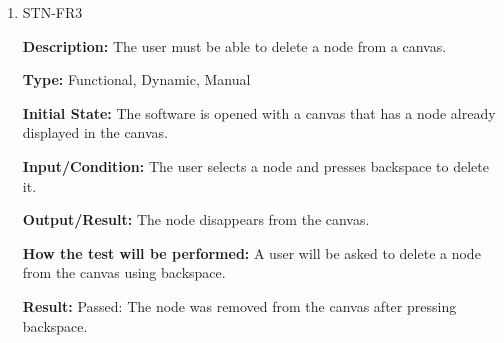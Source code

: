 \documentclass[12pt, titlepage]{article}
\begin{document}
\begin{enumerate}
\textbf{Output/Result:} The node moves to the new location.

\textbf{How the test will be performed:} A user will be asked to move a node from one location to another.

\textbf{Result:} Passed: The node was successfully moved to the new location.

\item{STN-FR3\\}

\textbf{Description:} The user must be able to delete a node from a canvas.

\textbf{Type:} Functional, Dynamic, Manual

\textbf{Initial State:} The software is opened with a canvas that has a node already displayed in the canvas.

\textbf{Input/Condition:} The user selects a node and presses backspace to delete it.

\textbf{Output/Result:} The node disappears from the canvas.

\textbf{How the test will be performed:} A user will be asked to delete a node from the canvas using backspace.

\textbf{Result:} Passed: The node was removed from the canvas after pressing backspace.

\end{enumerate}
\end{document}
